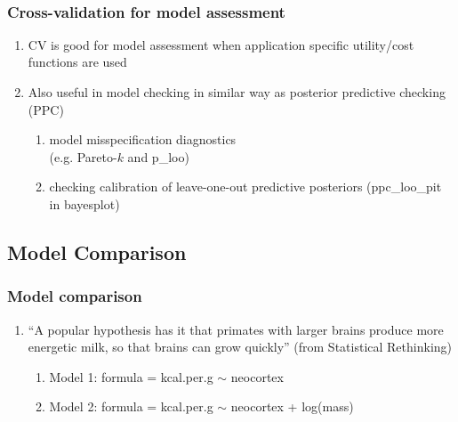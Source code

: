 \documentclass[10pt]{beamer}
\begin{document}
\begin{frame}{}
  \\

\end{frame}

\begin{frame}{}

\frametitle{Cross-validation for model assessment}

\begin{enumerate}
\item CV is good for model assessment when application specific utility/cost functions are used
\item<2-> Also useful in model checking in similar way as posterior
  predictive checking (PPC)
  \begin{enumerate}
  \item model misspecification diagnostics\\ (e.g. Pareto-$k$ and p\_loo)
  \item checking calibration of leave-one-out predictive posteriors
    (ppc\_loo\_pit in bayesplot)
  \end{enumerate}
\end{enumerate}

\end{frame}

\subsection{Model Comparison}
\frame{\subsectionpage}


\begin{frame}{}
\frametitle{Model comparison}

 \begin{enumerate}
 \item ``A popular hypothesis has it that primates with larger brains
   produce more energetic milk, so that brains can grow quickly'' (from
   Statistical Rethinking)
   \begin{enumerate}
     \item Model 1: formula = kcal.per.g $\sim$ neocortex
     \item Model 2: formula = kcal.per.g $\sim$ neocortex + log(mass)
   \end{enumerate}
 \end{enumerate}


\end{frame}
\end{document}
